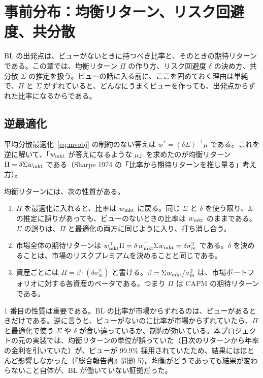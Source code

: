 \chapter{事前分布：均衡リターン、リスク回避度、共分散}\label{ch:prior}

BL の出発点は、ビューがないときに持つべき比率と、そのときの期待リターンである。この章では、均衡リターン $\Pi$ の作り方、リスク回避度 $\delta$ の決め方、共分散 $\Sigma$ の推定を扱う。ビューの話に入る前に、ここを固めておく理由は単純で、$\Pi$ と $\Sigma$ がずれていると、どんなにうまくビューを作っても、出発点からずれた比率になるからである。

\section{逆最適化}

平均分散最適化~\eqref{eq:mvobj} の制約のない答えは $w^*=(\delta\Sigma)^{-1}\mu$ である。これを逆に解いて、「$w_{\mathrm{mkt}}$ が答えになるような $\mu$」を求めたのが均衡リターン $\Pi=\delta\Sigma w_{\mathrm{mkt}}$ である（Sharpe 1974 の「比率から期待リターンを推し量る」考え方）。

均衡リターンには、次の性質がある。

\begin{enumerate}
\item $\Pi$ を最適化に入れると、比率は $w_{\mathrm{mkt}}$ に戻る。同じ $\Sigma$ と $\delta$ を使う限り、$\Sigma$ の推定に誤りがあっても、ビューのないときの比率は $w_{\mathrm{mkt}}$ のままである。$\Sigma$ の誤りは、$\Pi$ と最適化の両方に同じように入り、打ち消し合う。
\item 市場全体の期待リターンは $w_{\mathrm{mkt}}^{\top}\Pi=\delta\,w_{\mathrm{mkt}}^{\top}\Sigma w_{\mathrm{mkt}}=\delta\sigma_m^2$ である。$\delta$ を決めることは、市場のリスクプレミアムを決めることと同じである。
\item 資産ごとには $\Pi=\beta\cdot(\delta\sigma_m^2)$ と書ける。$\beta=\Sigma w_{\mathrm{mkt}}/\sigma_m^2$ は、市場ポートフォリオに対する各資産のベータである。つまり $\Pi$ は CAPM の期待リターンである。
\end{enumerate}

1 番目の性質は重要である。BL の比率が市場からずれるのは、ビューがあるときだけである。逆に言うと、ビューがないのに比率が市場からずれていたら、$\Pi$ と最適化で使う $\Sigma$ や $\delta$ が食い違っているか、制約が効いている。本プロジェクトの元の実装では、均衡リターンの単位が誤っていた（日次のリターンから年率の金利を引いていた）が、ビューが 99.9\% 採用されていたため、結果にはほとんど影響しなかった（『総合報告書』問題 5）。均衡がどうであっても結果が変わらないこと自体が、BL が働いていない証拠だった。

